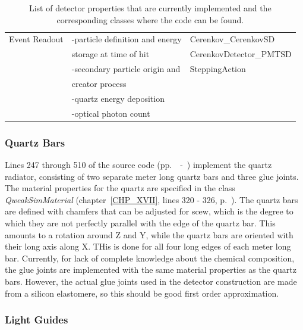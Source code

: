 \begin{table}
\begin{center}
\begin{tabular}{lll}
 Event Readout           &  -particle definition and energy  &  Cerenkov\_CerenkovSD    \\
                         &   storage at time of hit          &  CerenkovDetector\_PMTSD \\
                         &  -secondary particle origin and   &  SteppingAction          \\
                         &   creator process                 &  \\
                         &  -quartz energy deposition        &  \\
                         &  -optical photon count            &  \\
\hline
\end{tabular}
\end{center}
\caption{List of detector properties that are currently implemented and 
         the corresponding classes where the code can be found.}
\label{tbl:V-II}
\end{table}

\subsubsection{Quartz Bars}

Lines 247 through 510 of the source code
(pp.~\pageref{SourceV4}~-~\pageref{SourceV8}) implement the quartz
radiator, consisting of two separate meter long quartz bars and three
glue joints. The material properties for the quartz are specified in
the class {\it QweakSimMaterial} (chapter~\ref{CHP_XVII}, lines 320 -
326, p.~\pageref{SourceXVII6}). The quartz bars are defined with
chamfers that can be adjusted for scew, which is the degree to which
they are not perfectly parallel with the edge of the quartz bar. This
amounts to a rotation around Z and Y, while the quartz bars are
oriented with their long axis along X. THis is done for all four long
edges of each meter long bar. Currently, for lack of complete knowledge
about the chemical composition, the glue joints are implemented
with the same material properties as the quartz bars. However, the 
actual glue joints used in the detector construction are made from a
silicon elastomere, so this should be good first order approximation.

\subsubsection{Light Guides}

